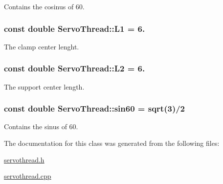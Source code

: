 Contains the cosinus of 60. 

\hypertarget{a00008_a6281142e50115dd8c914c14cfae6f90d}{}
\subsubsection[{L1}]{\setlength{\rightskip}{0pt plus 5cm}const double Servo\+Thread\+::\+L1 = 6.\hspace{0.3cm}{\ttfamily [private]}}\label{a00008_a6281142e50115dd8c914c14cfae6f90d}


The clamp center lenght. 

\hypertarget{a00008_a3d51c16b1f498b48a6ecbfaadaba6ed2}{}
\subsubsection[{L2}]{\setlength{\rightskip}{0pt plus 5cm}const double Servo\+Thread\+::\+L2 = 6.\hspace{0.3cm}{\ttfamily [private]}}\label{a00008_a3d51c16b1f498b48a6ecbfaadaba6ed2}


The support center length. 

\hypertarget{a00008_aaa3e2dd194949b12f8a41ebd0d62fde9}{}
\subsubsection[{sin60}]{\setlength{\rightskip}{0pt plus 5cm}const double Servo\+Thread\+::sin60 = sqrt(3)/2\hspace{0.3cm}{\ttfamily [private]}}\label{a00008_aaa3e2dd194949b12f8a41ebd0d62fde9}


Contains the sinus of 60. 



The documentation for this class was generated from the following files\+:\begin{DoxyCompactItemize}
\item 
\hyperlink{a00021}{servothread.\+h}\item 
\hyperlink{a00020}{servothread.\+cpp}\end{DoxyCompactItemize}
